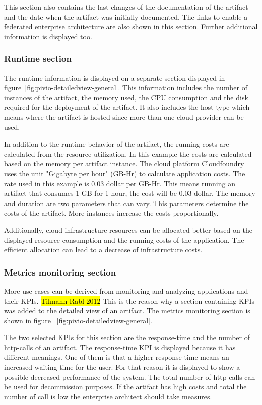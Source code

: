 This section also contains the last changes of the documentation of the artifact and the date when the artifact was initially documented. The links to enable a federated enterprise architecture are also shown in this section. Further additional information is displayed too.

\subsubsection{Runtime section}

The runtime information is displayed on a separate section displayed in figure~\ref{fig:pivio-detailedview-general}. This information includes the number of instances of the artifact, the memory used, the CPU consumption and the disk required for the deployment of the artifact. It also includes the host type which means where the artifact is hosted since more than one cloud provider can be used.

In addition to the runtime behavior of the artifact, the running costs are calculated from the resource utilization. In this example the costs are calculated based on the memory per artifact instance. The cloud platform 
Cloudfoundry uses the unit "Gigabyte per hour" (GB-Hr) to calculate application costs. The rate used in this example is 0.03 dollar per GB-Hr. This means running an artifact that consumes 1 GB for 1 hour, the cost will be 0.03 dollar. The memory and duration are two parameters that can vary. This parameters determine the costs of the artifact. More instances increase the costs proportionally.

Additionally, cloud infrastructure resources can be allocated better based on the displayed resource consumption and the running costs of the application. The efficient allocation can lead to a decrease of infrastructure costs.

\subsubsection{Metrics monitoring section}

More use cases can be derived from monitoring and analyzing applications and their KPIs. \hl{Tilmann Rabl 2012} This is the reason why a section containing KPIs was added to the detailed view of an artifact. The metrics monitoring section is shown in figure ~\ref{fig:pivio-detailedview-general}.

The two selected KPIs for this section are the response-time and the number of http-calls of an artifact. The response-time KPI is displayed because it has different meanings. One of them is that a higher response time means an increased waiting time for the user. For that reason it is displayed to show a possible decreased performance of the system.
The total number of http-calls can be used for decommission purposes. If the artifact has high costs and total the number of call is low the enterprise architect should take measures.

